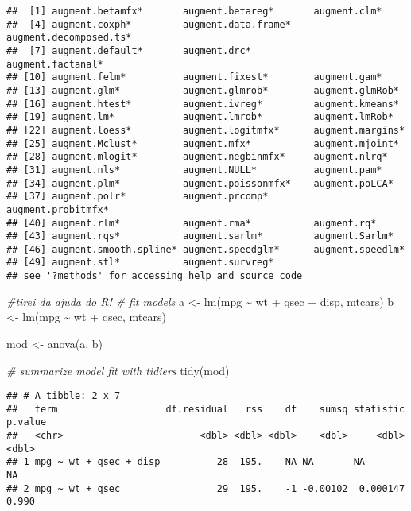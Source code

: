\documentclass[
]{book}
\newenvironment{Shaded}{\begin{snugshade}}{\end{snugshade}}
\newcommand{\CommentTok}[1]{\textcolor[rgb]{0.56,0.35,0.01}{\textit{#1}}}
\newcommand{\FunctionTok}[1]{\textcolor[rgb]{0.00,0.00,0.00}{#1}}
\newcommand{\NormalTok}[1]{#1}
\newcommand{\OtherTok}[1]{\textcolor[rgb]{0.56,0.35,0.01}{#1}}
\newcommand{\SpecialCharTok}[1]{\textcolor[rgb]{0.00,0.00,0.00}{#1}}
\begin{document}
\begin{verbatim}
##  [1] augment.betamfx*       augment.betareg*       augment.clm*          
##  [4] augment.coxph*         augment.data.frame*    augment.decomposed.ts*
##  [7] augment.default*       augment.drc*           augment.factanal*     
## [10] augment.felm*          augment.fixest*        augment.gam*          
## [13] augment.glm*           augment.glmrob*        augment.glmRob*       
## [16] augment.htest*         augment.ivreg*         augment.kmeans*       
## [19] augment.lm*            augment.lmrob*         augment.lmRob*        
## [22] augment.loess*         augment.logitmfx*      augment.margins*      
## [25] augment.Mclust*        augment.mfx*           augment.mjoint*       
## [28] augment.mlogit*        augment.negbinmfx*     augment.nlrq*         
## [31] augment.nls*           augment.NULL*          augment.pam*          
## [34] augment.plm*           augment.poissonmfx*    augment.poLCA*        
## [37] augment.polr*          augment.prcomp*        augment.probitmfx*    
## [40] augment.rlm*           augment.rma*           augment.rq*           
## [43] augment.rqs*           augment.sarlm*         augment.Sarlm*        
## [46] augment.smooth.spline* augment.speedglm*      augment.speedlm*      
## [49] augment.stl*           augment.survreg*      
## see '?methods' for accessing help and source code
\end{verbatim}

\begin{Shaded}
\begin{Highlighting}[]
\CommentTok{\#tirei da ajuda do R!}
\CommentTok{\# fit models}
\NormalTok{a }\OtherTok{\textless{}{-}} \FunctionTok{lm}\NormalTok{(mpg }\SpecialCharTok{\textasciitilde{}}\NormalTok{ wt }\SpecialCharTok{+}\NormalTok{ qsec }\SpecialCharTok{+}\NormalTok{ disp, mtcars)}
\NormalTok{b }\OtherTok{\textless{}{-}} \FunctionTok{lm}\NormalTok{(mpg }\SpecialCharTok{\textasciitilde{}}\NormalTok{ wt }\SpecialCharTok{+}\NormalTok{ qsec, mtcars)}

\NormalTok{mod }\OtherTok{\textless{}{-}} \FunctionTok{anova}\NormalTok{(a, b)}

\CommentTok{\# summarize model fit with tidiers}
\FunctionTok{tidy}\NormalTok{(mod)}
\end{Highlighting}
\end{Shaded}

\begin{verbatim}
## # A tibble: 2 x 7
##   term                   df.residual   rss    df    sumsq statistic p.value
##   <chr>                        <dbl> <dbl> <dbl>    <dbl>     <dbl>   <dbl>
## 1 mpg ~ wt + qsec + disp          28  195.    NA NA       NA         NA    
## 2 mpg ~ wt + qsec                 29  195.    -1 -0.00102  0.000147   0.990
\end{verbatim}
\end{document}
